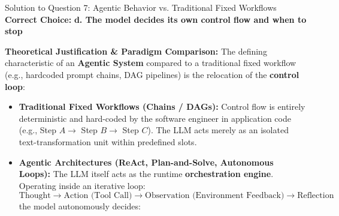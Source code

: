 \documentclass[11pt,a4paper]{article}
\begin{document}
\begin{solutionbox}{Solution to Question 7: Agentic Behavior vs. Traditional Fixed Workflows}
\textbf{Correct Choice:} \textbf{d. The model decides its own control flow and when to stop}

\medskip
\noindent
\textbf{Theoretical Justification \& Paradigm Comparison:}
The defining characteristic of an \textbf{Agentic System} compared to a traditional fixed workflow (e.g., hardcoded prompt chains, DAG pipelines) is the relocation of the \textbf{control loop}:
\begin{itemize}[leftmargin=1.5em]
    \item \textbf{Traditional Fixed Workflows (Chains / DAGs):} Control flow is entirely deterministic and hard-coded by the software engineer in application code (e.g., Step $A \to$ Step $B \to$ Step $C$). The LLM acts merely as an isolated text-transformation unit within predefined slots.
    \item \textbf{Agentic Architectures (ReAct, Plan-and-Solve, Autonomous Loops):} The LLM itself acts as the runtime \textbf{orchestration engine}. Operating inside an iterative loop:
    \begin{equation*}
        \text{Thought} \longrightarrow \text{Action (Tool Call)} \longrightarrow \text{Observation (Environment Feedback)} \longrightarrow \text{Reflection}
    \end{equation*}
    the model autonomously decides:
\end{itemize}


\end{solutionbox}
\end{document}
